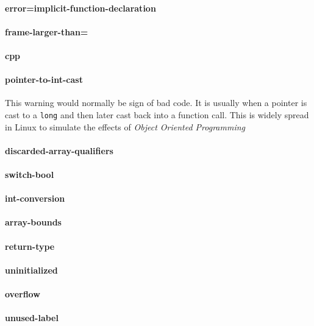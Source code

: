 \documentclass[a4paper,11pt]{report}
\begin{document}
    \paragraph{error=implicit-function-declaration}


    \paragraph{frame-larger-than=}
    \paragraph{cpp}
    \paragraph{pointer-to-int-cast}

\label{par:pointertoint}
This warning would normally be sign of bad code. It is usually when a pointer 
is cast to a \texttt{long} and then later cast back into a function call. This 
is widely spread in Linux to simulate the effects of \emph{Object Oriented 
Programming}

    \paragraph{discarded-array-qualifiers}
    \paragraph{switch-bool}
    \paragraph{int-conversion}
    \paragraph{array-bounds}
    \paragraph{return-type}
    \paragraph{uninitialized}
    \paragraph{overflow}
    \paragraph{unused-label}
\end{document}
